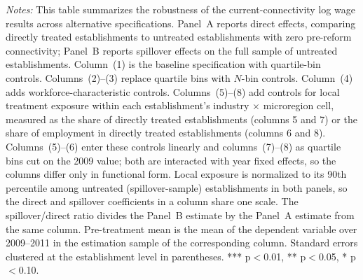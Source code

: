 \begin{table}[H]
\begin{minipage}{\linewidth}
    \textit{Notes:} This table summarizes the robustness of the current-connectivity log wage results across alternative specifications. Panel~A reports direct effects, comparing directly treated establishments to untreated establishments with zero pre-reform connectivity; Panel~B reports spillover effects on the full sample of untreated establishments. Column~(1) is the baseline specification with quartile-bin controls. Columns~(2)--(3) replace quartile bins with $N$-bin controls. Column~(4) adds workforce-characteristic controls. Columns~(5)--(8) add controls for local treatment exposure within each establishment's industry $\times$ microregion cell, measured as the share of directly treated establishments (columns 5 and 7) or the share of employment in directly treated establishments (columns 6 and 8). Columns~(5)--(6) enter these controls linearly and columns~(7)--(8) as quartile bins cut on the 2009 value; both are interacted with year fixed effects, so the columns differ only in functional form. Local exposure is normalized to its 90th percentile among untreated (spillover-sample) establishments in both panels, so the direct and spillover coefficients in a column share one scale. The spillover/direct ratio divides the Panel~B estimate by the Panel~A estimate from the same column. Pre-treatment mean is the mean of the dependent variable over 2009--2011 in the estimation sample of the corresponding column. Standard errors clustered at the establishment level in parentheses. *** p$<$0.01, ** p$<$0.05, * p$<$0.10.
\end{minipage}
\end{table}
